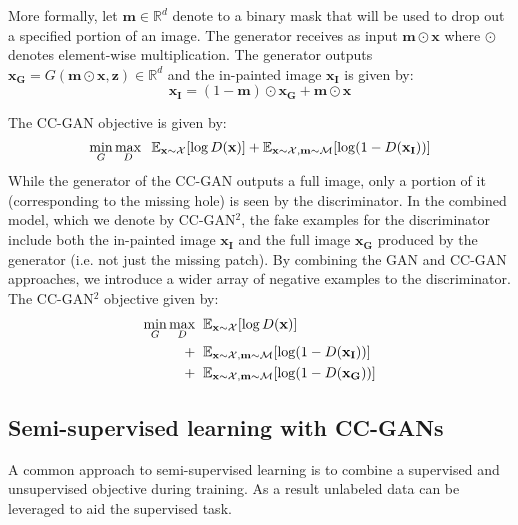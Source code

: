 \documentclass{article} %
\begin{document}
More formally, let $\mathbf{m} \in \mathbb{R}^d$ denote to a binary mask that will be used to drop out a specified portion of an image. 
The generator receives as input $\mathbf{m} \odot \mathbf{x}$ where $\odot$ denotes element-wise multiplication.
The generator outputs $\mathbf{x_G} = G(\mathbf{m} \odot \mathbf{x}, \mathbf{z})
\in \mathbb{R}^d$ and the in-painted image $\mathbf{x_I}$ is given by: 
\begin{equation}
\mathbf{x_I} = (1 - \mathbf{m}) \odot \mathbf{x_G} + \mathbf{m} \odot \mathbf{x}
\end{equation}

The CC-GAN objective is given by:
\begin{equation}
\label{eqn:ccgan}
\min_G \max_D \hspace{2mm}\mathbb{E}_{\mathbf{x} \sim \mathcal{X}}[\log D(\mathbf{x})]  +
\mathbb{E}_{\mathbf{x} \sim \mathcal{X}, \mathbf{m} \sim \mathcal{M}} [\log(1 - D(\mathbf{x_I}))]
\end{equation}%
While the generator of the CC-GAN outputs a full image, only a portion of it (corresponding to the missing hole) is seen by the discriminator. 
In the combined model, which we denote by CC-GAN$^2$, the fake
examples for the discriminator include both the in-painted image $\mathbf{x_I}$ and
the full image $\mathbf{x_G}$ produced by the generator (i.e. not just the missing patch). 
By combining the GAN and CC-GAN approaches, we introduce a wider array of negative examples to the discriminator. The CC-GAN$^2$ objective given by:
\begin{align}
\label{eqn:ccgan_comb}
\min_G \max_D \hspace{2mm} & \mathbb{E}_{\mathbf{x} \sim \mathcal{X}}[\log D(\mathbf{x})]  \\
+ \hspace{2mm} &\mathbb{E}_{\mathbf{x} \sim \mathcal{X}, \mathbf{m} \sim \mathcal{M}} [\log(1 - D(\mathbf{x_I}))]\\
+ \hspace{2mm} &\mathbb{E}_{\mathbf{x} \sim \mathcal{X}, \mathbf{m} \sim \mathcal{M}} [\log(1 - D(\mathbf{x_G} ))]
\end{align}\subsection{Semi-supervised learning with CC-GANs}
A common approach to semi-supervised learning is to combine a supervised and unsupervised objective during training.
As a result unlabeled data can be leveraged to aid the supervised task.
\end{document}
